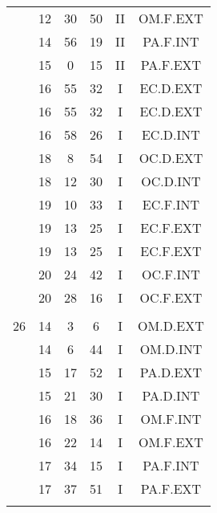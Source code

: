 \documentclass[12pt, a4paper]{article}
\begin{document}
\begin{multicols}{3}
{\begin{tabular}{c c c c c c}
	 	 	 	 & 12 & 30 & 50 & II & OM.F.EXT\\%
	 	 	 	 & 14 & 56 & 19 & II & PA.F.INT\\%
	 	 	 	 & 15 & 0 & 15 & II & PA.F.EXT\\%
	 	 	 	 & 16 & 55 & 32 & I & EC.D.EXT\\%
	 	 	 	 & 16 & 55 & 32 & I & EC.D.EXT\\%
	 	 	 	 & 16 & 58 & 26 & I & EC.D.INT\\%
	 	 	 	 & 18 & 8 & 54 & I & OC.D.EXT\\%
	 	 	 	 & 18 & 12 & 30 & I & OC.D.INT\\%
	 	 	 	 & 19 & 10 & 33 & I & EC.F.INT\\%
	 	 	 	 & 19 & 13 & 25 & I & EC.F.EXT\\%
	 	 	 	 & 19 & 13 & 25 & I & EC.F.EXT\\%
	 	 	 	 & 20 & 24 & 42 & I & OC.F.INT\\%
	 	 	 	 & 20 & 28 & 16 & I & OC.F.EXT\\%
	 	 	 	 & & & & & \\%
	 	 	 	26 & 14 & 3 & 6 & I & OM.D.EXT\\%
	 	 	 	 & 14 & 6 & 44 & I & OM.D.INT\\%
	 	 	 	 & 15 & 17 & 52 & I & PA.D.EXT\\%
	 	 	 	 & 15 & 21 & 30 & I & PA.D.INT\\%
	 	 	 	 & 16 & 18 & 36 & I & OM.F.INT\\%
	 	 	 	 & 16 & 22 & 14 & I & OM.F.EXT\\%
	 	 	 	 & 17 & 34 & 15 & I & PA.F.INT\\%
	 	 	 	 & 17 & 37 & 51 & I & PA.F.EXT\\%
	 	 	 	 & & & & & \\%

\end{tabular}}
\end{multicols}
\end{document}
